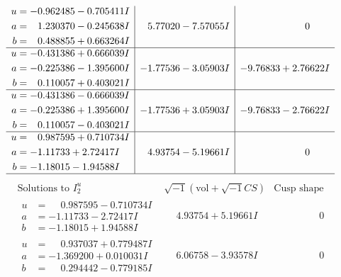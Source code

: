 \documentclass[1p]{elsarticle_modified}
\theoremstyle{definition}
\newcommand{\I}{\sqrt{-1}}
\begin{document}
$$\begin{array}{c|c|c}
\begin{aligned}
u &= -0.962485 - 0.705411 I \\
a &= \phantom{-}1.230370 - 0.245638 I \\
b &= \phantom{-}0.488855 + 0.663264 I\end{aligned}
 & \phantom{-}5.77020 - 7.57055 I & \phantom{-0.000000 } 0 \\ \hline\begin{aligned}
u &= -0.431386 + 0.666039 I \\
a &= -0.225386 - 1.395600 I \\
b &= \phantom{-}0.110057 + 0.403021 I\end{aligned}
 & -1.77536 - 3.05903 I & -9.76833 + 2.76622 I \\ \hline\begin{aligned}
u &= -0.431386 - 0.666039 I \\
a &= -0.225386 + 1.395600 I \\
b &= \phantom{-}0.110057 - 0.403021 I\end{aligned}
 & -1.77536 + 3.05903 I & -9.76833 - 2.76622 I \\ \hline\begin{aligned}
u &= \phantom{-}0.987595 + 0.710734 I \\
a &= -1.11733 + 2.72417 I \\
b &= -1.18015 - 1.94588 I\end{aligned}
 & \phantom{-}4.93754 - 5.19661 I & \phantom{-0.000000 } 0\\
 \hline 
 \end{array}$$\newpage$$\begin{array}{c|c|c}  
\text{Solutions to }I^u_{2}& \I (\text{vol} + \sqrt{-1}CS) & \text{Cusp shape}\\
 \hline 
\begin{aligned}
u &= \phantom{-}0.987595 - 0.710734 I \\
a &= -1.11733 - 2.72417 I \\
b &= -1.18015 + 1.94588 I\end{aligned}
 & \phantom{-}4.93754 + 5.19661 I & \phantom{-0.000000 } 0 \\ \hline\begin{aligned}
u &= \phantom{-}0.937037 + 0.779487 I \\
a &= -1.369200 + 0.010031 I \\
b &= \phantom{-}0.294442 - 0.779185 I\end{aligned}
 & \phantom{-}6.06758 - 3.93578 I & \phantom{-0.000000 } 0 \\ \hline\begin{aligned}

\end{aligned}
\end{array}$$
\end{document}
